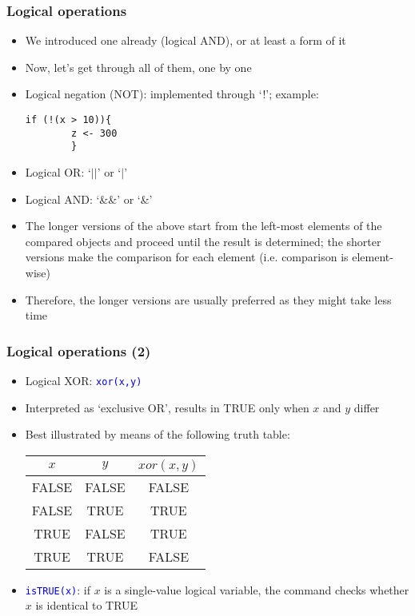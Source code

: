 \documentclass[10pt]{beamer}
\newcommand{\cc}[1]{\texttt{\textcolor{blue}{#1}}}
\theoremstyle{definition}
\begin{document}
\begin{frame}[fragile]
\frametitle{Logical operations}
\begin{itemize}
	\item We introduced one already (logical AND), or at least a form of it
	\item Now, let's get through all of them, one by one
	\item Logical negation (NOT): implemented through `!'; example:
	\begin{lstlisting}[style = rstyle, breaklines]
	if (!(x > 10)){
		z <- 300
		}
	\end{lstlisting}
	\item Logical OR: `$||$' or `$|$'
	\item Logical AND: `\&\&' or `\&'
	\item The longer versions of the above start from the left-most elements of the compared objects and proceed until the result is determined; the shorter versions make the comparison for each element (i.e. comparison is element-wise)
	\item Therefore, the longer versions are usually preferred as they might take less time
\end{itemize}
\end{frame}

\begin{frame}[fragile]
\frametitle{Logical operations (2)}
\begin{itemize}
	\item Logical XOR: \cc{xor(x,y)}
	\item Interpreted as `exclusive OR', results in TRUE only when $x$ and $y$ differ
	\item Best illustrated by means of the following truth table:
	\renewcommand{\arraystretch}{1.4}
	\begin{center}
		\begin{tabular}{ccc}
			\hline
			$x$ & $y$ & $xor(x,y)$\\
			\hline
			FALSE & FALSE & FALSE\\
			FALSE & TRUE & TRUE \\
			TRUE & FALSE & TRUE \\
			TRUE & TRUE & FALSE\\
			\hline
		\end{tabular}
	\end{center}
	\item \cc{isTRUE(x)}: if $x$ is a single-value logical variable, the command checks whether $x$ is identical to TRUE
\end{itemize}
\end{frame}
\end{document}
